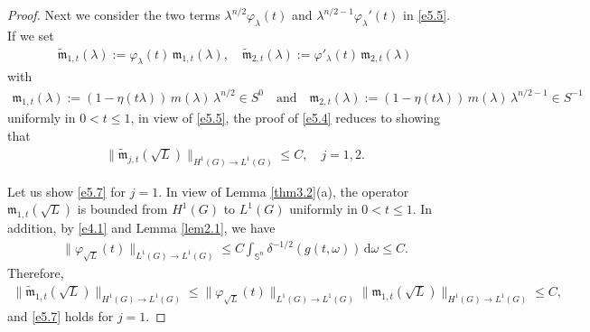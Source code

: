 \documentclass[a4paper,12pt]{amsart}
\numberwithin{equation}{section}
\theoremstyle{definition}
\theoremstyle{remark}
\numberwithin{theorem}{section}
\renewcommand{\SS}{\mathbb{S}}
\renewcommand{\d}{\mathrm{d}}
\begin{document}
\begin{proof}
Next we consider the two terms $\lambda^{n/2}\varphi_\lambda(t)$ and $\lambda^{n/2-1}\varphi_\lambda'(t)$ in \eqref{e5.5}. If we set
\begin{align*}
\widetilde{\mathfrak{m}}_{1,t}(\lambda):=\varphi_\lambda(t)\,\mathfrak{m}_{1,t}(\lambda),\quad \widetilde{\mathfrak{m}}_{2,t}(\lambda):=\varphi'_\lambda(t)\,\mathfrak{m}_{2,t}(\lambda)
\end{align*}
with
\begin{align*}
\mathfrak{m}_{1,t}(\lambda):=(1-\eta(t\lambda))\, m(\lambda)\,\lambda^{n/2}\in S^0\quad \mbox{and}\quad \mathfrak{m}_{2,t}(\lambda):=(1-\eta(t\lambda))\, m(\lambda)\,\lambda^{n/2-1}\in S^{-1}
\end{align*}
uniformly in $0<t\leq 1$, in view of \eqref{e5.5}, the proof of \eqref{e5.4} reduces to showing that
\begin{align}\label{e5.7}
\|\widetilde{\mathfrak{m}}_{j,t}(\sqrt{L})\|_{H^1(G)\to L^1(G)}\leq C,\quad j=1,2.
\end{align} 

Let us show \eqref{e5.7} for $j=1$. In view of Lemma \ref{thm3.2}(a), the operator $\mathfrak{m}_{1,t}(\sqrt{L})$ is bounded from $H^1(G)$ to $L^1(G)$ uniformly in $0<t\leq 1$. In addition, by \eqref{e4.1} and Lemma \ref{lem2.1}, we have
\begin{align*}
\|\varphi_{\sqrt{L}}(t)\|_{L^1(G)\to L^1(G)}\leq C\int_{\SS^n}\delta^{-1/2}(g(t,\omega))\,\d\omega\leq C.
\end{align*}
Therefore,
\begin{align*}
\|\widetilde{\mathfrak{m}}_{1,t}(\sqrt{L})\|_{H^1(G)\to L^1(G)}\leq \|\varphi_{\sqrt{L}}(t)\|_{L^1(G)\to L^1(G)}\|\mathfrak{m}_{1,t}(\sqrt{L})\|_{H^1(G)\to L^1(G)}\leq C,
\end{align*}
and \eqref{e5.7} holds for $j=1$.


\end{proof}
\end{document}
